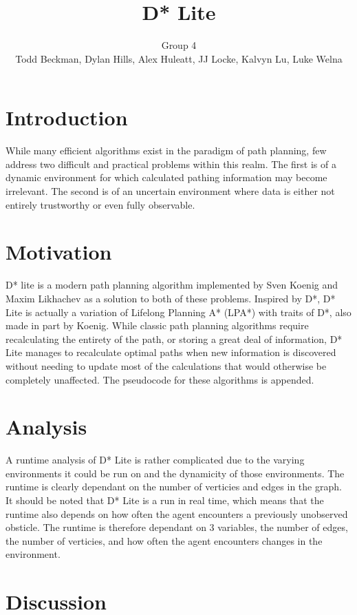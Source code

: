 \documentclass[11pt]{article}
\title{D* Lite}
\author{Group 4\\
\small{Todd Beckman, Dylan Hills, Alex Huleatt, JJ Locke, Kalvyn Lu, Luke Welna}}
\date{}
\begin{document}
\maketitle
\section{Introduction}

While many efficient algorithms exist in the paradigm of path planning, few address two difficult and practical problems within this realm. The first is of a dynamic environment for which calculated pathing information may become irrelevant. The second is of an uncertain environment where data is either not entirely trustworthy or even fully observable. 

\section{Motivation}

D* lite is a modern path planning algorithm implemented by Sven Koenig and Maxim Likhachev as a solution to both of these problems. Inspired by D*, D* Lite is actually a variation of Lifelong Planning A* (LPA*) with traits of D*, also made in part by Koenig. While classic path planning algorithms require recalculating the entirety of the path, or storing a great deal of information, D* Lite manages to recalculate optimal paths when new information is discovered without needing to update most of the calculations that would otherwise be completely unaffected. The pseudocode for these algorithms is appended.

\section{Analysis}

A runtime analysis of D* Lite is rather complicated due to the varying environments it could be run on and the dynamicity of those environments. The runtime is clearly dependant on the number of verticies and edges in the graph. It should be noted that D* Lite is a run in real time, which  means that the runtime also depends on how often the agent encounters a previously unobserved obsticle. The runtime is therefore dependant on 3 variables, the number of edges, the number of verticies, and how often the agent encounters changes in the environment.

\section{Discussion}
\end{document}
